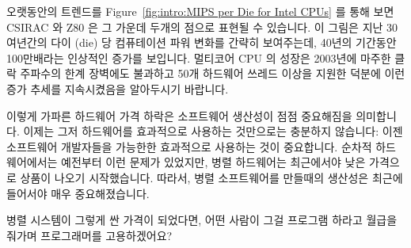 오랫동안의 트렌드를 Figure~\ref{fig:intro:MIPS per Die for Intel CPUs} 를 통해
보면 CSIRAC 와 Z80 은 그 가운데 두개의 점으로 표현될 수 있습니다.
이 그림은 지난 30여년간의 다이 (die) 당 컴퓨테이션 파워 변화를 간략히
보여주는데, 40년의 기간동안 100만배라는 인상적인 증가를 보입니다.
멀티코어 CPU 의 성장은 2003년에 마주한 클락 주파수의 한계 장벽에도 불과하고
50개 하드웨어 쓰레드 이상을 지원한 덕분에 이런 증가 추세를 지속시켰음을
알아두시기 바랍니다.

이렇게 가파른 하드웨어 가격 하락은 소프트웨어 생산성이 점점 중요해짐을
의미합니다.
이제는 그저 하드웨어를 효과적으로 사용하는 것만으로는 충분하지 않습니다:
이젠 소프트웨어 개발자들을 가능한한 효과적으로 사용하는 것이 중요합니다.
순차적 하드웨어에서는 예전부터 이런 문제가 있었지만, 병렬 하드웨어는 최근에서야
낮은 가격으로 상품이 나오기 시작했습니다.
따라서, 병렬 소프트웨어를 만들때의 생산성은 최근에 들어서야 매우
중요해졌습니다.

\QuickQuiz{}
	병렬 시스템이 그렇게 싼 가격이 되었다면, 어떤 사람이 그걸 프로그램
	하라고 월급을 줘가며 프로그래머를 고용하겠어요?
\iffalse

